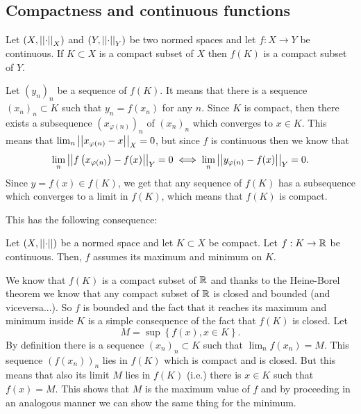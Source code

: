 \documentclass{article}
\begin{document}
\subsection{Compactness and continuous functions}
\begin{proposition}
	Let $(X,\left|\left|\cdot\right|\right|_X)$ and $(Y,\left|\left|\cdot\right|\right|_Y)$ be two normed spaces and let $f:X\to Y$ be continuous. If $K\subset X$ is a compact subset of $X$ then $f(K)$ is a compact subset of $Y$.
\end{proposition}
\begin{fancyproof}
	Let ${(y_{n})}_{n}$ be a sequence of $f(K)$. It means that there is a sequence ${(x_{n})}_{n}\subset K$ such that $y_{n}=f(x_n)$ for any $n$. Since $K$ is compact, then there exists a subsequence ${\left(x_{\varphi(n)}\right)}_{n}$ of ${(x_{n})}_{n}$ which converges to $x\in K$. This means that $\lim_n\left|\left|x_{\varphi(n)}-x\right|\right|_{X}=0$, but since $f$ is continuous then we know that 
	\begin{equation*}
		\lim_n\left|\left|f\left(x_{\varphi(n)}\right)-f(x)\right|\right|_{Y}=0\iff	\lim_n\left|\left|y_{\varphi(n)}-f(x)\right|\right|_{Y}=0.
	\end{equation*}
	Since $y=f(x)\in f(K)$, we get that any sequence of $f(K)$ has a subsequence which converges to a limit in $f(K)$, which means that $f(K)$ is compact.
\end{fancyproof}
This has the following consequence:
\begin{theorem}
	Let $\left(X,\left|\left|\cdot\right|\right|\right)$ be a normed space and let $K\subset X$ be compact. Let $f:K\to\mathbb{R}$ be continuous. Then, $f$ assumes its maximum and minimum on $K$.
\end{theorem}
\begin{fancyproof}
	We know that $f(K)$ is a compact subset of $\mathbb{R}$ and thanks to the Heine-Borel theorem we know that any compact subset of $\mathbb{R}$ is closed and bounded (and viceversa...). So $f$ is bounded and the fact that it reaches its maximum and minimum inside $K$ is a simple consequence of the fact that $f(K)$ is closed. Let
	\begin{equation*}
		M=\sup\left\{f(x),x\in K\right\}.
	\end{equation*}
	By definition there is a sequence ${(x_{n})}_{n}\subset K$ such that $\lim_{n}f(x_{n})=M$. This sequence ${(f(x_{n}))}_{n}$ lies in $f(K)$ which is compact and is closed. But this means that also its limit $M$ lies in $f(K)$ (i.e.) there is $x\in K$ such that $f(x)=M$. This shows that $M$ is the maximum value of $f$ and by proceeding in an analogous manner we can show the same thing for the minimum.
\end{fancyproof}
\end{document}
